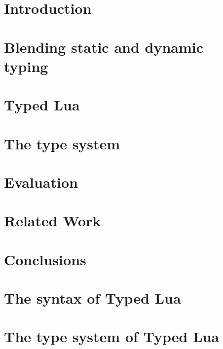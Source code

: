 \documentclass[pdftex,12pt,a4paper]{report}
\begin{document}
\newpage
{}

\chapter{Introduction}
\label{chap:intro}


\chapter{Blending static and dynamic typing}
\label{chap:review}


\chapter{Typed Lua}
\label{chap:typedlua}


\chapter{The type system}
\label{chap:system}


\chapter{Evaluation}
\label{chap:evaluation}


\chapter{Related Work}
\label{chap:related}


\chapter{Conclusions}
\label{chap:conc}





\appendix

\chapter{The syntax of Typed Lua}
\label{app:syntax}


\chapter{The type system of Typed Lua}
\label{app:rules}

\end{document}
